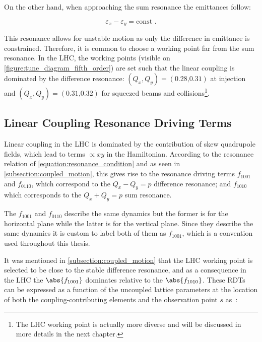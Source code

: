 On the other hand, when approaching the sum resonance the emittances follow:

\begin{equation}
    \varepsilon_x - \varepsilon_y = \mathrm{const} \text{ .}
    \label{equation:coupled_emittances_sum_resonance}
\end{equation}

This resonance allows for unstable motion as only the difference in emittance is constrained.
Therefore, it is common to choose a working point far from the sum resonance.
In the LHC, the working points (visible on \cref{figure:tune_diagram_fifth_order}) are set such that the linear coupling is dominated by the difference resonance: \((Q_x, Q_y) = (0.28 \text{,} 0.31)\) at injection and \((Q_x, Q_y) = (0.31 \text{,} 0.32)\) for squeezed beams and collisions\footnote{The LHC working point is actually more diverse and will be discussed in more details in the next chapter.}.

\subsection{Linear Coupling Resonance Driving Terms}
\label{subsection:measurement_coupling_rdts}

Linear coupling in the LHC is dominated by the contribution of skew quadrupole fields, which lead to terms \(\propto xy\) in the Hamiltonian.
According to the resonance relation of \cref{equation:resonance_condition} and as seen in \cref{subsection:coupled_motion}, this gives rise to the resonance driving terms \(f_{1001}\) and \(f_{0110}\), which correspond to the \(Q_x - Q_y = p\) difference resonance; and \(f_{1010}\) which corresponds to the \(Q_x + Q_y = p\) sum resonance.

The \(f_{1001}\) and \(f_{0110}\) describe the same dynamics but the former is for the horizontal plane while the latter is for the vertical plane.
Since they describe the same dynamics it is custom to label both of them as \(f_{1001}\), which is a convention used throughout this thesis.

It was mentioned in \cref{subsection:coupled_motion} that the LHC working point is selected to be close to the stable difference resonance, and as a consequence in the LHC the \(\abs{f_{1001}}\) dominates relative to the \(\abs{f_{1010}}\).
These RDTs can be expressed as a function of the uncoupled lattice parameters at the location of both the coupling-contributing elements and the observation point \(s\) as~\cite{PHREV:Guignard:Betatron_Coupling_Radiation}:

